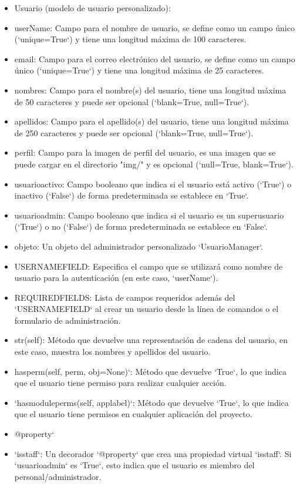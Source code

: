 \documentclass{article}
\begin{document}
\begin{itemize}
        \item Usuario (modelo de usuario personalizado):
        \item userName: Campo para el nombre de usuario, se define como un campo único (`unique=True`) y tiene una longitud máxima de 100 caracteres.
        \item email: Campo para el correo electrónico del usuario, se define como un campo único (`unique=True`) y tiene una longitud máxima de 25 caracteres.
        \item nombres: Campo para el nombre(s) del usuario, tiene una longitud máxima de 50 caracteres y puede ser opcional (`blank=True, null=True`).
        \item apellidos: Campo para el apellido(s) del usuario, tiene una longitud máxima de 250 caracteres y puede ser opcional (`blank=True, null=True`).
        \item perfil: Campo para la imagen de perfil del usuario, es una imagen que se puede cargar en el directorio "img/" y es opcional   (`null=True, blank=True`).
        \item usuarioactivo: Campo booleano que indica si el usuario está activo (`True`) o inactivo (`False`) de forma predeterminada se establece en `True`.
        \item usuarioadmin: Campo booleano que indica si el usuario es un superusuario (`True`) o no (`False`) de forma predeterminada se establece en `False`.
        \item objeto: Un objeto del administrador personalizado `UsuarioManager`.
       \item USERNAMEFIELD: Especifica el campo que se utilizará como nombre de usuario para la autenticación (en este caso, `userName`).
        \item REQUIREDFIELDS: Lista de campos requeridos además del `USERNAMEFIELD` al crear un usuario desde la línea de comandos o el formulario de administración.
       \item str(self): Método que devuelve una representación de cadena del usuario, en este caso, muestra los nombres y apellidos del usuario.
    
       \item hasperm(self, perm, obj=None)`: Método que devuelve `True`, lo que indica que el usuario tiene permiso para realizar cualquier acción.
       \item`hasmoduleperms(self, applabel)`: Método que devuelve `True`, lo que indica que el usuario tiene permisos en cualquier aplicación del proyecto.
    
        \item @property`
       \item`isstaff`: Un decorador `@property` que crea una propiedad virtual `isstaff`. Si `usuarioadmin` es `True`, esto indica que el usuario es miembro del personal/administrador.
        \end{itemize}
        
\end{document}
